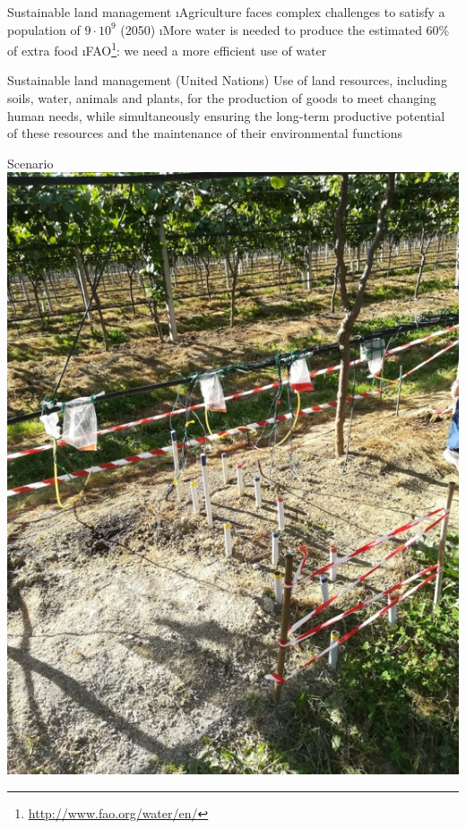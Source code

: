 
\begin{frame}{Sustainable land management} 
\i Agriculture faces complex challenges to satisfy a population of $9\cdot10^9$ (2050)
\i More water is needed to produce the estimated 60\% of extra food
\i FAO\footnote{\url{http://www.fao.org/water/en/}}: we need a more efficient use of water

\begin{block}{Sustainable land management (United Nations)}
Use of land resources, including soils, water, animals and plants, for the production of goods to meet changing human needs, while simultaneously ensuring the long-term productive potential of these resources and the maintenance of their environmental functions
\end{block}
\end{frame}

\begin{frame}{Scenario}
\includegraphics[height=.8\textheight]{imgs/casestudy_real.jpg}
\end{frame}

